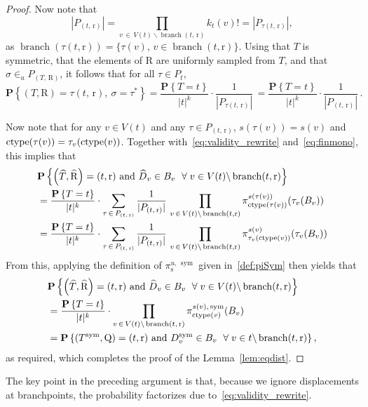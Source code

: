 \documentclass[AHL,Unicode,longabstracts,published]{cedram}
\newcommand{\rQ}{\mathrm{Q}}
\newcommand{\rR}{\mathrm{R}}
\newcommand{\rr}{\mathrm{r}}
\newcommand{\rs}{\mathrm{s}}
\DeclareMathOperator{\sym}{sym}
\DeclareMathOperator{\branch}{branch }
\DeclareMathOperator{\cht}{ctype}
\newcommand{\p}[1]{\mathbf{P}\left\{#1\right\}}
\newcommand{\Permvecs}{P}
\let\oldhat\hat
\renewcommand*{\hat}[1]{\mathchoice{\widehat{#1}}{\widehat{#1}}{\oldhat{#1}}{\oldhat{#1}}}
\let\oldforall\forall
\renewcommand*{\forall}{\mathrel{\oldforall}}
\begin{document}
\begin{proof}
Now note that
\[
|\Permvecs_{(t,\,\rr)}|= \prod_{v\,\in\,V(t)\backslash \branch(t,\,\rr)} k_t(v)!=|\Permvecs_{\tau(t,\,\rr)}|,
\]
as $\branch{(\tau(t,\rr))} = \{\tau(v),\, v\in \branch(t,\rr)\}$. Using that $T$ is symmetric, that the elements of $\rR$ are uniformly sampled from $T$, and that $\sigma \in_u \Permvecs_{(T,\,\rR)}$, it follows that for all $\tau \in \Permvecs_t$,
\begin{equation}\label{eq:finmono}
\p{(T,\rR)=\tau(t,\,\rr),\ \sigma=\tau^*} =
\frac{\p{T=t}}{|t|^k}\cdot \frac{1}{|\Permvecs_{\tau(t,\,\rr)}|}\, =
\frac{\p{T=t}}{|t|^k}\cdot \frac{1}{|\Permvecs_{(t,\,\rr)}|}\,.
\end{equation}

Now note that for any $v\in V(t)$ and any $\tau \in \Permvecs_{(t,\,\rr)}$, $s(\tau(v))=s(v)$ and $\cht(\tau(v))\linebreak= \tau_v(\cht(v))$. Together with~\eqref{eq:validity_rewrite} and~\eqref{eq:finmono}, this implies that
\begin{align*}
& \p{\left(\hat T,\hat \rR\right)=(t,\rr)\text{ and } \hat D_v \in B_v\ \forall v \in V(t)\backslash \branch(t,\rr)}\\
& =
\frac{\p{T=t}}{|t|^k} \cdot \sum_{\tau\,\in\,\Permvecs_{(t,\,\rr)}}
\frac{1}{|\Permvecs_{(t,\,\rr)}|}\,
\prod_{v\,\in\,V(t)\backslash \branch(t,\rr)} \pi^{s(\tau(v))}_{\cht(\tau(v))}(\tau_v(B_v))
\\
& =
\frac{\p{T=t}}{|t|^k} \cdot \sum_{\tau\,\in\,\Permvecs_{(t,\,\rr)}}
\frac{1}{|\Permvecs_{(t,\,\rr)}|}\,
\prod_{v\,\in\,V(t)\backslash \branch(t,\rr)} \pi^{s(v)}_{\tau_v(\cht(v))}(\tau_v(B_v))
\end{align*}
From this, applying the definition of $\pi^{u,\,\sym}_{\rs}$ given in~\eqref{def:piSym} then yields that
\begin{align*}
& \p{\left(\hat T,\hat \rR\right)=(t,\rr)\text{ and } \hat D_v \in B_v\ \forall v \in V(t)\backslash \branch(t,\rr)}\\
& =
\frac{\p{T=t}}{|t|^k}
\cdot \prod_{v\,\in\,V(t)\backslash \branch(t,\,\rr)} \pi_{\cht(v)}^{s(v),\,\sym}(B_v)\\
& =
\p{(T^{\sym},\rQ)=(t,\rr) \text{ and }D^{\sym}_v \in B_v\ \forall v \in t \backslash \branch(t,\rr)},
\end{align*}
as required, which completes the proof of the Lemma~\ref{lem:eqdist}.
\end{proof}

The key point in the preceding argument is that, because we ignore displacements at branchpoints, the probability factorizes due to~\eqref{eq:validity_rewrite}.
\end{document}

